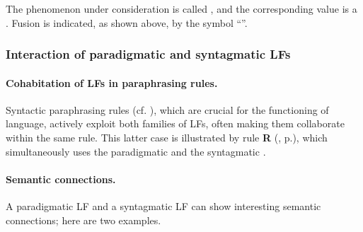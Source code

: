 The phenomenon under consideration is called , and the corresponding value is a . Fusion is indicated, as shown above, by the symbol ``\fused''\label{fusionFL}.

\subsubsection{Interaction of paradigmatic and syntagmatic LFs}\label{sec:interactionLFs}

\paragraph*{Cohabitation of LFs in paraphrasing rules.}

Syntactic paraphrasing rules (cf. ), which are crucial for the functioning of language, actively exploit both families of LFs, often making them collaborate within the same rule. This latter case is illustrated by rule \textbf{R} (, p.\thinspace\pageref{txt:RParaphOper1}), which simultaneously uses the paradigmatic  and the syntagmatic .

\paragraph*{Semantic connections.}

A paradigmatic LF and a syntagmatic LF can show interesting semantic connections; here are two examples.

